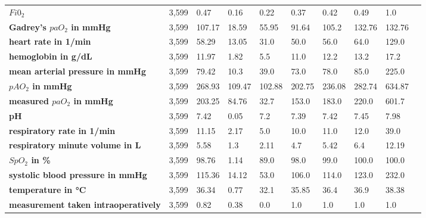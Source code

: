 \documentclass[referee,lineno,pdflatex,sn-nature]{sn-jnl}%
\theoremstyle{thmstyleone}%
\theoremstyle{thmstyletwo}%
\theoremstyle{thmstylethree}%
\begin{document}
\begin{appendices}
\begin{table}
\begin{tabularx}{\textwidth}{@{} L lllllllll @{}}
        \textbf{\footnotemark[2]$Fi0_2$} & 3,599 & 0.47 & 0.16 & 0.22 & 0.37 & 0.42 & 0.49 & 1.0 \\ 
        \textbf{\footnotemark[2]Gadrey’s $paO_2$ in mmHg} & 3,599 & 107.17 & 18.59 & 55.95 & 91.64 & 105.2 & 132.76 & 132.76 \\ 
        \textbf{\footnotemark[2]heart rate in 1/min} & 3,599 & 58.29 & 13.05 & 31.0 & 50.0 & 56.0 & 64.0 & 129.0 \\ 
        \textbf{\footnotemark[2]hemoglobin in g/dL} & 3,599 & 11.97 & 1.82 & 5.5 & 11.0 & 12.2 & 13.2 & 17.2 \\ 
        \textbf{\footnotemark[2]mean arterial pressure in mmHg} & 3,599 & 79.42 & 10.3 & 39.0 & 73.0 & 78.0 & 85.0 & 225.0 \\ 
        \textbf{\footnotemark[2]$pAO_2$ in mmHg} & 3,599 & 268.93 & 109.47 & 102.88 & 202.75 & 236.08 & 282.74 & 634.87 \\ 
        \textbf{\footnotemark[2]measured $paO_2$ in mmHg} & 3,599 & 203.25 & 84.76 & 32.7 & 153.0 & 183.0 & 220.0 & 601.7 \\ 
        \textbf{\footnotemark[2]pH} & 3,599 & 7.42 & 0.05 & 7.2 & 7.39 & 7.42 & 7.45 & 7.98 \\ 
        \textbf{\footnotemark[2]respiratory rate in 1/min} & 3,599 & 11.15 & 2.17 & 5.0 & 10.0 & 11.0 & 12.0 & 39.0 \\ 
        \textbf{\footnotemark[2]respiratory minute volume in L} & 3,599 & 5.58 & 1.3 & 2.11 & 4.7 & 5.42 & 6.4 & 12.19 \\ 
        \textbf{\footnotemark[2]$SpO_2$ in \%} & 3,599 & 98.76 & 1.14 & 89.0 & 98.0 & 99.0 & 100.0 & 100.0 \\ 
        \textbf{\footnotemark[2]systolic blood pressure in mmHg} & 3,599 & 115.36 & 14.12 & 53.0 & 106.0 & 114.0 & 123.0 & 232.0 \\ 
        \textbf{\footnotemark[2]temperature in °C} & 3,599 & 36.34 & 0.77 & 32.1 & 35.85 & 36.4 & 36.9 & 38.38 \\ 
        \textbf{\footnotemark[2]measurement taken intraoperatively} & 3,599 & 0.82 & 0.38 & 0.0 & 1.0 & 1.0 & 1.0 & 1.0 \\ \hline
    \end{tabularx}
\end{table}



\end{appendices}
\end{document}
